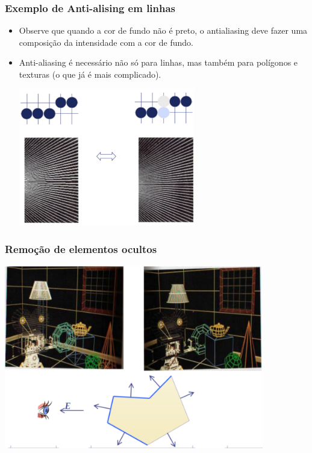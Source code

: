 \documentclass{beamer}
\begin{document}
	\begin{frame}
		\frametitle{Exemplo de Anti-alising em linhas}
		\begin{itemize}
		\item Observe que quando a cor de fundo não é preto, o antialiasing deve fazer uma composição da intensidade com a cor de fundo.  
		\item Anti-aliasing é necessário não só para linhas, mas também para polígonos e texturas (o que já é mais complicado).
		\begin{center}
			\includegraphics[height=6cm]{antaliasing.jpg}
		\end{center}
		\end{itemize}
	\end{frame}
	\begin{frame}
		\frametitle{Remoção de elementos ocultos}
		\begin{center}
			\includegraphics[height=8cm]{remocao.png}
		\end{center}
	\end{frame}
\end{document}

